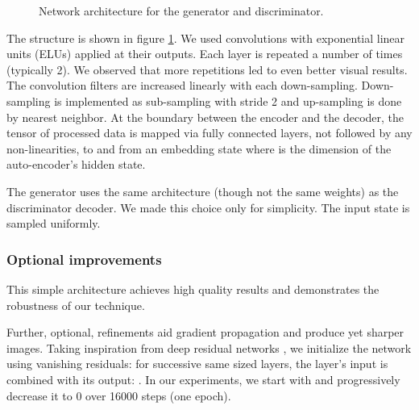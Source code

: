 \documentclass[english]{article}
\begin{document}
\begin{figure}


\caption{Network architecture for the generator and discriminator.\label{fig:Network}}


\end{figure}


The structure is shown in figure \ref{fig:Network}. We used 
convolutions with exponential linear units \cite{clevert2015fast_elu}
(ELUs) applied at their outputs. Each layer is repeated a number of
times (typically 2). We observed that more repetitions led to even
better visual results. The convolution filters are increased linearly
with each down-sampling. Down-sampling is implemented as sub-sampling
with stride 2 and up-sampling is done by nearest neighbor. At the
boundary between the encoder and the decoder, the tensor of processed
data is mapped via fully connected layers, not followed by any non-linearities,
to and from an embedding state  where 
is the dimension of the auto-encoder's hidden state. 

The generator  uses
the same architecture (though not the same weights) as the discriminator
decoder. We made this choice only for simplicity. The input state
is  sampled uniformly. 


\subsubsection{Optional improvements}

This simple architecture achieves high quality results and demonstrates
the robustness of our technique.

Further, optional, refinements aid gradient propagation and produce
yet sharper images. Taking inspiration from deep residual networks
\cite{he2016deep}, we initialize the network using vanishing residuals:
for successive same sized layers, the layer's input is combined with
its output: .
In our experiments, we start with  and progressively decrease
it to 0 over 16000 steps (one epoch). 
\end{document}
